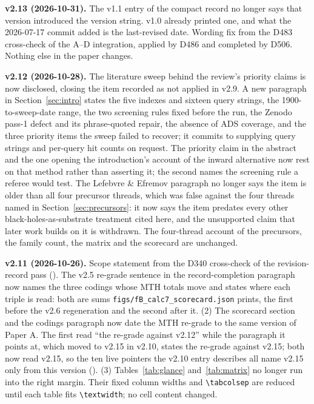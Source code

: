 \documentclass[11pt]{article}
\begin{document}
\textbf{v2.13 (2026-10-31).} The v1.1 entry of the compact record no longer says that version introduced the version string. v1.0 already printed one, and what the 2026-07-17 commit added is the last-revised date. Wording fix from the D483 cross-check of the A--D integration, applied by D486 and completed by D506. Nothing else in the paper changes.

\textbf{v2.12 (2026-10-28).} The literature sweep behind the review's priority claims is now disclosed, closing the item recorded as not applied in v2.9. A new paragraph in Section~\ref{sec:intro} states the five indexes and sixteen query strings, the 1900-to-sweep-date range, the two screening rules fixed before the run, the Zenodo pass-1 defect and its phrase-quoted repair, the absence of ADS coverage, and the three priority items the sweep failed to recover; it commits to supplying query strings and per-query hit counts on request. The priority claim in the abstract and the one opening the introduction's account of the inward alternative now rest on that method rather than asserting it; the second names the screening rule a referee would test. The Lefebvre \& Efremov paragraph no longer says the item is older than all four precursor threads, which was false against the four threads named in Section~\ref{sec:precursors}: it now says the item predates every other black-holes-as-substrate treatment cited here, and the unsupported claim that later work builds on it is withdrawn. The four-thread account of the precursors, the family count, the matrix and the scorecard are unchanged.

\textbf{v2.11 (2026-10-26).} Scope statement from the D340 cross-check of the revision-record pass (). The v2.5 re-grade sentence in the record-completion paragraph now names the three codings whose MTH totals move and states where each triple is read: both are sums \texttt{figs/fB\_calc7\_scorecard.json} prints, the first before the v2.6 regeneration and the second after it. (2) The scorecard section and the codings paragraph now date the MTH re-grade to the same version of Paper A. The first read ``the re-grade against v2.12'' while the paragraph it points at, which moved to v2.15 in v2.10, states the re-grade against v2.15; both now read v2.15, so the ten live pointers the v2.10 entry describes all name v2.15 only from this version (). (3) Tables~\ref{tab:glance} and~\ref{tab:matrix} no longer run into the right margin. Their fixed column widths and \texttt{\textbackslash tabcolsep} are reduced until each table fits \texttt{\textbackslash textwidth}; no cell content changed.
\end{document}
